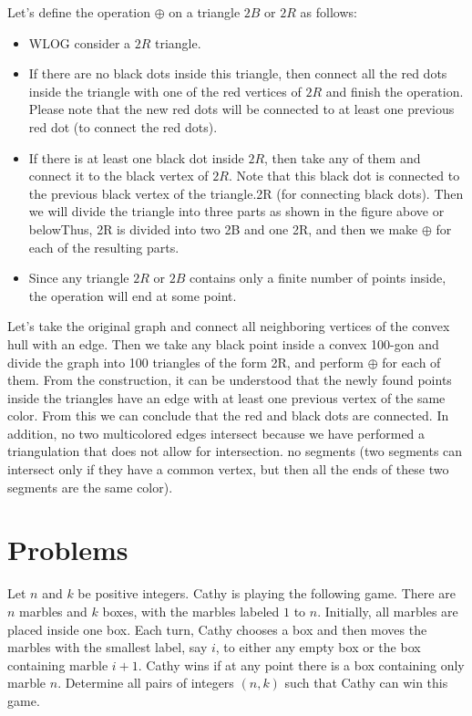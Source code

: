 Let's define the operation $\oplus $ on a triangle $2B$ or $2R$ as follows:
\begin{itemize}
    \item WLOG consider a $2R$ triangle.
    \item If there are no black dots inside this triangle, then connect all the red dots inside the triangle with one of the red vertices of $2R$ and finish the operation. Please note that the new red dots will be connected to at least one previous red dot (to connect the red dots).
    \item If there is at least one black dot inside $2R$, then take any of them and connect it to the black vertex of $2R$. Note that this black dot is connected to the previous black vertex of the triangle.2R (for connecting black dots). Then we will divide the triangle into three parts as shown in the figure above or belowThus, 2R is divided into two 2B and one 2R, and then we make $\oplus $ for each of the resulting parts.
    \item Since any triangle $2R$ or $2B$ contains only a finite number of points inside, the operation will end at some point.
\end{itemize}
Let's take the original graph and connect all neighboring vertices of the convex hull with an edge. Then we take any black point inside a convex 100-gon and divide the graph into 100 triangles of the form 2R, and perform $\oplus $ for each of them. From the construction, it can be understood that the newly found points inside the triangles have an edge with at least one previous vertex of the same color. From this we can conclude that the red and black dots are connected. In addition, no two multicolored edges intersect because we have performed a triangulation that does not allow for intersection.
no segments (two segments can intersect only if they have a common vertex, but then all the ends of these two segments are the same color).

\newpage

\section{Problems}

\begin{problem} [APMO 2022]
    Let $n$ and $k$ be positive integers. Cathy is playing the following game. There are $n$ marbles and $k$ boxes, with the marbles labeled $1$ to $n$. Initially, all marbles are placed inside one box. Each turn, Cathy chooses a box and then moves the marbles with the smallest label, say $i$, to either any empty box or the box containing marble $i + 1$. Cathy wins if at any point there is a box containing only marble $n$. Determine all pairs of integers $(n, k)$ such that Cathy can win this game.
\end{problem}

